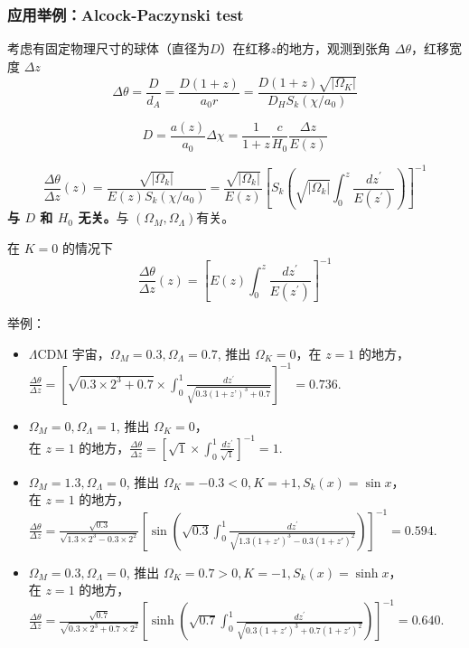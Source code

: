 \documentclass[]{ctexart}
\begin{document}
\subsubsection{应用举例：Alcock-Paczynski test}

考虑有固定物理尺寸的球体（直径为$D$）在红移$z$的地方，观测到张角 $\Delta \theta$，红移宽度 $\Delta z$  
\begin{equation}
    \Delta \theta = \frac{D }{d_A} = \frac{D(1+z)}{a_0r} = \frac{D(1+z)\sqrt{|\Omega_K|}}{D_H S_k(\chi/a_0)}
\end{equation}

\begin{equation}
    D=\frac{a(z)}{a_{0}} \Delta \chi=\frac{1}{1+z} \frac{c}{H_{0}} \frac{\Delta z}{E(z)}
\end{equation}

\begin{equation}
    \frac{\Delta \theta}{\Delta z}(z)=\frac{\sqrt{\left|\Omega_{k}\right|}}{E(z) S_{k}\left(\chi / a_{0}\right)}=\frac{\sqrt{\left|\Omega_{k}\right|}}{E(z)}\left[S_k\left(\sqrt{\left|\Omega_{k}\right|} \int_{0}^{z} \frac{d z^{\prime}}{E\left(z^{\prime}\right)}\right)\right]^{-1}
\end{equation}
\textbf{与 $D$ 和 $ H_0$ 无关。}与 $\left(\Omega_M, \Omega_\Lambda\right) $有关。

在 $K=0$ 的情况下 
\begin{equation}
    \frac{\Delta \theta}{\Delta z}(z)= \left[E(z) \int_{0}^{z} \frac{d z^{\prime}}{E\left(z^{\prime}\right)}\right]^{-1}
\end{equation}

举例：
\begin{itemize}
    \item $\Lambda$CDM 宇宙，$\Omega_M=0.3,\Omega_\Lambda=0.7$, 推出 $\Omega_K=0$，在 $z=1$ 的地方，$\frac{\Delta \theta}{\Delta z}=\left[\sqrt{0.3 \times 2^{3}+0.7} \times \int_{0}^{1} \frac{d z^{\prime}}{\sqrt{0.3\left(1+z’\right)^{3}+0.7}}\right]^{-1}=0.736.$ 
    \item $\Omega_M=0, \Omega_\Lambda=1$, 推出 $\Omega_K=0$，\\ 在 $z=1$ 的地方，$\frac{\Delta \theta}{\Delta z}=\left[\sqrt{1} \times \int_{0}^{1} \frac{d z^{\prime}}{\sqrt{1}}\right]^{-1}=1.$ 
    \item $\Omega_M=1.3, \Omega_\Lambda=0$, 推出 $\Omega_K=-0.3<0, K=+1, S_k(x)=\sin x$，\\ 在 $z=1$ 的地方，\\$\frac{\Delta \theta}{\Delta z}=\frac{\sqrt{0.3}}{\sqrt{1.3\times 2^3-0.3\times 2^2}}\left[\sin(\sqrt{0.3}  \int_{0}^{1} \frac{d z^{\prime}}{\sqrt{1.3(1+z')^3 - 0.3 (1+z')^2}})\right]^{-1}=0.594.$  
    \item $\Omega_M=0.3, \Omega_\Lambda=0$, 推出 $\Omega_K=0.7>0, K=-1, S_k(x)=\sinh x$，\\ 在 $z=1$ 的地方，\\ $\frac{\Delta \theta}{\Delta z}=\frac{\sqrt{0.7}}{\sqrt{0.3\times 2^3 + 0.7\times 2^2}}\left[\sinh(\sqrt{0.7}  \int_{0}^{1} \frac{d z^{\prime}}{\sqrt{0.3(1+z')^3 + 0.7 (1+z')^2}})\right]^{-1}=0.640.$  
\end{itemize}
\end{document}
